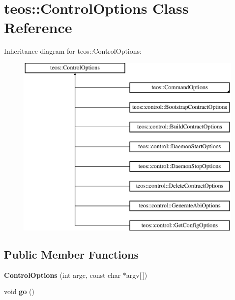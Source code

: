\hypertarget{classteos_1_1_control_options}{}\section{teos\+:\+:Control\+Options Class Reference}
\label{classteos_1_1_control_options}
Inheritance diagram for teos\+:\+:Control\+Options\+:\begin{figure}[H]
\begin{center}
\leavevmode
\includegraphics[height=9.000000cm]{classteos_1_1_control_options}
\end{center}
\end{figure}
\subsection*{Public Member Functions}
\begin{DoxyCompactItemize}
\item 
\mbox{\label{classteos_1_1_control_options_ae997028704fe0f8086096d7fa4b71ee9}} 
{\bfseries Control\+Options} (int argc, const char $\ast$argv\mbox{[}$\,$\mbox{]})
\item 
\mbox{\label{classteos_1_1_control_options_ad3496976524c0ca5288018725119fb39}} 
void {\bfseries go} ()
\end{DoxyCompactItemize}
